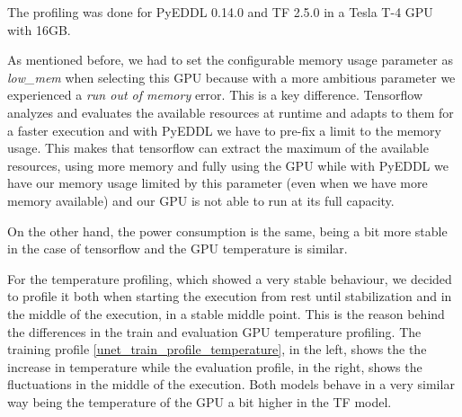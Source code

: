 The profiling was done for PyEDDL 0.14.0 and TF 2.5.0 in a Tesla T-4 GPU with 16GB.

As mentioned before, we had to set the configurable memory usage parameter as \textit{low\_mem} when selecting this GPU because with a more ambitious parameter we experienced a \textit{run out of memory} error. This is a key difference. Tensorflow analyzes and evaluates the available resources at runtime and adapts to them for a faster execution and with PyEDDL we have to pre-fix a limit to the memory usage. This makes that tensorflow can extract the maximum of the available resources, using more memory and fully using the GPU while with PyEDDL we have our memory usage limited by this parameter (even when we have more memory available) and our GPU is not able to run at its full capacity. 

On the other hand, the power consumption is the same, being a bit more stable in the case of tensorflow and the GPU temperature is similar.

For the temperature profiling, which showed a very stable behaviour, we decided to profile it both when starting the execution from rest until stabilization and in the middle of the execution, in a stable middle point. This is the reason behind the differences in the train and evaluation GPU temperature profiling. The training profile \ref{unet_train_profile_temperature}, in the left, shows the the increase in temperature while the evaluation profile, in the right, shows the fluctuations in the middle of the execution. Both models behave in a very similar way being the temperature of the GPU a bit higher in the TF model.

